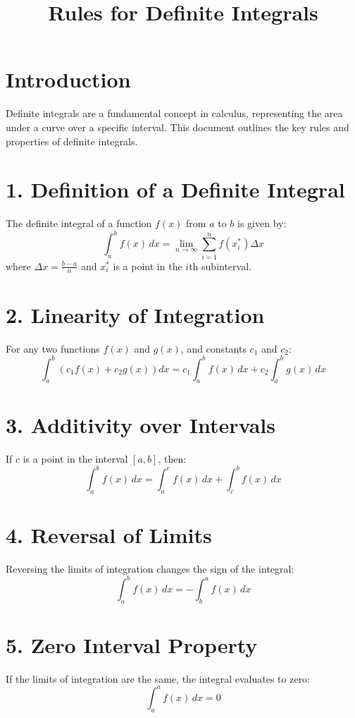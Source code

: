 \documentclass[12pt]{article}
\begin{document}
\title{Rules for Definite Integrals}
\author{}
\date{}
\maketitle

\section*{Introduction}
Definite integrals are a fundamental concept in calculus, representing the area under a curve over a specific interval. This document outlines the key rules and properties of definite integrals.

\section*{1. Definition of a Definite Integral}
The definite integral of a function $f(x)$ from $a$ to $b$ is given by:
\[
\int_a^b f(x) \, dx = \lim_{n \to \infty} \sum_{i=1}^n f(x_i^*) \Delta x
\]
where $\Delta x = \frac{b-a}{n}$ and $x_i^*$ is a point in the $i$th subinterval.

\section*{2. Linearity of Integration}
For any two functions $f(x)$ and $g(x)$, and constants $c_1$ and $c_2$:
\[
\int_a^b \left(c_1 f(x) + c_2 g(x)\right) dx = c_1 \int_a^b f(x) \, dx + c_2 \int_a^b g(x) \, dx
\]

\section*{3. Additivity over Intervals}
If $c$ is a point in the interval $[a, b]$, then:
\[
\int_a^b f(x) \, dx = \int_a^c f(x) \, dx + \int_c^b f(x) \, dx
\]

\section*{4. Reversal of Limits}
Reversing the limits of integration changes the sign of the integral:
\[
\int_a^b f(x) \, dx = -\int_b^a f(x) \, dx
\]

\section*{5. Zero Interval Property}
If the limits of integration are the same, the integral evaluates to zero:
\[
\int_a^a f(x) \, dx = 0
\]
\end{document}
